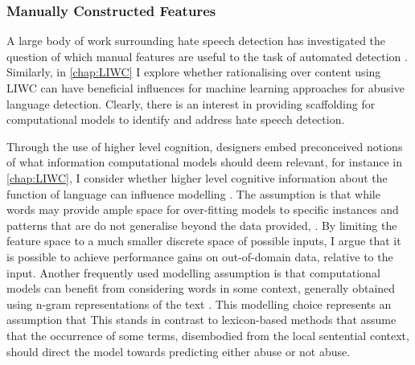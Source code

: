 \subsubsection{Manually Constructed Features}
A large body of work surrounding hate speech detection has investigated the question of which manual features are useful to the task of automated detection \citep{Waseem:2016,Chiril:2019,Fortuna:2018,Stankovic:2020}.
Similarly, in \autoref{chap:LIWC} I explore whether rationalising over content using LIWC can have beneficial influences for machine learning approaches for abusive language detection.
Clearly, there is an interest in providing scaffolding for computational models to identify and address hate speech detection.

Through the use of higher level cognition, designers embed preconceived notions of what information computational models should deem relevant, for instance in \autoref{chap:LIWC}, I consider whether higher level cognitive information about the function of language can influence modelling .
The assumption is that while words may provide ample space for over-fitting models to specific instances and patterns that are do not generalise beyond the data provided, .
By limiting the feature space to a much smaller discrete space of possible inputs, I argue that it is possible to achieve performance gains on out-of-domain data, relative to the input.
Another frequently used modelling assumption is that computational models can benefit from considering words in some context, generally obtained using n-gram representations of the text \citep{Waseem-Hovy:2016,Davidson:2017,Chiril:2019}.
This modelling choice represents an assumption that 
This stands in contrast to lexicon-based methods \citep{Hurtlex:2019} that assume that the occurrence of some terms, disembodied from the local sentential context, should direct the model towards predicting either abuse or not abuse.

